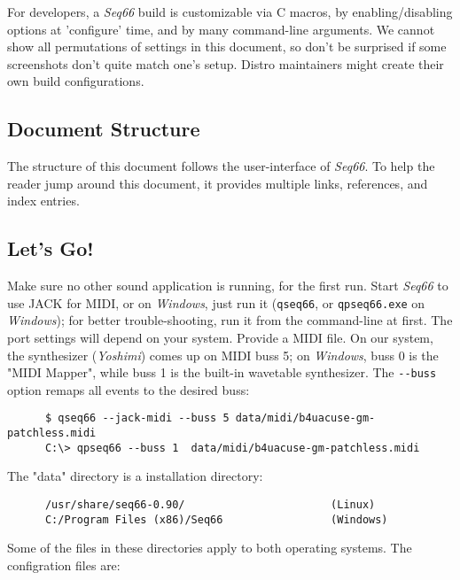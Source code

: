 \documentclass[
 11pt,
 twoside,
 a4paper,
 final                                 %
]{article}
\begin{document}
   For developers, a \textsl{Seq66} build is customizable via C macros,
   by enabling/disabling options at 'configure' time, and by many
   command-line arguments.  We cannot show all permutations of settings in this
   document, so don't be surprised if some screenshots don't quite match
   one's setup.  Distro maintainers might create their own build
   configurations.

\subsection{Document Structure}
\label{subsec:introduction_document_structure}

   The structure of this document follows the user-interface of
   \textsl{Seq66}.
   To help the reader jump around this document, it provides
   multiple links, references, and index entries.

\subsection{Let's Go!}
\label{subsec:introduction_lets_go}

   Make sure no other sound application is running, for the first run.
   Start \textsl{Seq66} to use JACK for MIDI, or
   on \textsl{Windows}, just run it (\texttt{qseq66}, or \texttt{qpseq66.exe}
   on \textsl{Windows}); for better trouble-shooting, run it from
   the command-line at first.
   The port settings will depend on your system.
   Provide a MIDI file.
   On our system, the synthesizer (\textsl{Yoshimi}) comes up on MIDI buss 5;
   on \textsl{Windows}, buss 0 is the "MIDI Mapper", while buss 1 is the
   built-in wavetable synthesizer.
   The \texttt{-{}-buss} option remaps all events to the desired buss:

   \begin{verbatim}
      $ qseq66 --jack-midi --buss 5 data/midi/b4uacuse-gm-patchless.midi
      C:\> qpseq66 --buss 1  data/midi/b4uacuse-gm-patchless.midi
   \end{verbatim}

   The "data" directory is a installation directory:

   \begin{verbatim}
      /usr/share/seq66-0.90/                       (Linux)
      C:/Program Files (x86)/Seq66                 (Windows)
   \end{verbatim}

   Some of the files in these directories apply to both operating systems.
   The configration files are:
\end{document}
